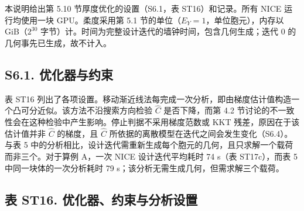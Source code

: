 \documentclass[preprint,12pt,authoryear]{elsarticle}
\begin{document}
本说明给出第 5.10 节厚度优化的设置（S6.1，表 ST16）和记录。所有 NICE 运行均使用一块 GPU。柔度采用第 5.1 节的单位（\(E_Y=1\)，单位胞元），内存以 GiB（\(2^{30}\) 字节）计。时间为完整设计迭代的墙钟时间，包含几何生成；迭代 0 的几何事先已生成，故不计入。

\subsection{S6.1. 优化器与约束}

表 ST16 列出了各项设置。移动渐近线法每完成一次分析，即由梯度估计值构造一个凸可分近似。该方法不沿搜索方向检验 \(\widehat C\) 是否下降，而第 4.2 节讨论的不一致性会在这种检验中产生影响。停止判据不采用梯度范数或 KKT 残差，原因在于该估计值并非 \(\widehat C\) 的梯度，且 \(\widehat C\) 所依据的离散模型在迭代之间会发生变化（S6.4）。与表 5 中的分析相比，设计迭代需重新生成每个胞元的几何，且只求解一个载荷而非三个。对于算例 A，一次 NICE 设计迭代平均耗时 74 s（表 ST17c），而表 5 中同一块体的一次分析耗时 79 s；该分析无需生成几何，但需求解三个载荷。

\subsection{表 ST16. 优化器、约束与分析设置}
\end{document}
